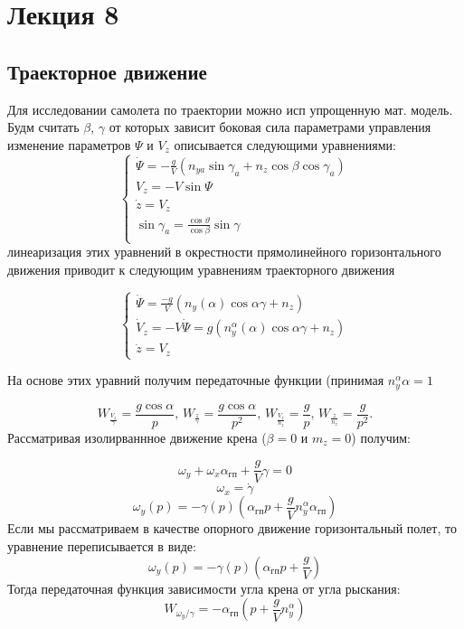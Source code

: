 \documentclass{article}
\begin{document}
\section{Лекция 8}
\subsection{Траекторное движение}
Для исследовании самолета по траектории можно исп упрощенную мат. модель. Будм считать $\beta$, $\gamma$ от которых зависит боковая сила параметрами управления изменение параметров $\Psi$ и $V_z$ описывается следующими уравнениями:
\begin{equation}
\begin{cases}
\dot{\Psi} = -\frac{g}{V}(n_{ya} \sin{\gamma_a} + n_z \cos{\beta} \cos{\gamma_a})\\
V_z = -V\sin{\Psi}\\
\dot{z} = V_z\\

\sin{\gamma_a} = \frac{\cos{\vartheta}}{\cos{\beta}} \sin{\gamma} \\
\end{cases}
\end{equation}
линеаризация этих уравнений в окрестности прямолинейного горизонтального движения приводит к следующим уравнениям траекторного движения

\begin{equation}
\begin{cases}
\dot{\Psi} = \frac{-g}{V}(n_y(\alpha)\cos{\alpha}\gamma + n_z)\\
\dot{V}_z = -V \dot{\Psi} = g(n_y^{\alpha}(\alpha) \cos{\alpha\gamma} + n_z)\\
\dot{z} = V_z
\end{cases}
\end{equation}

На основе этих уравний получим передаточные функции (принимая $n_y^{\alpha} \alpha =1 $ 

\[
W_{\frac{V_z}{\gamma}} = \frac{g\cos{\alpha}}{p}, \, W_{\frac{z}{\gamma}} = \frac{g\cos{\alpha}}{p^2}, \, W_{\frac{V_z}{n_z}}= \frac{g}{p}, \, W_{\frac{z}{n_z}} = \frac{g}{p^2}.
\]
Рассматривая изолирваннное движение крена ($\beta = 0$ и $m_z = 0$) получим:

\[
\omega_y + \omega_x \alpha_{гп} + \frac{g}{V}\gamma = 0
\]
\[
\omega_x = \dot{\gamma}
\]
\[
\omega_y(p) = -\gamma(p)(\alpha_{гп}p + \frac{g}{V}n_y^\alpha \alpha_{гп})
\]
Если мы рассматриваем в качестве опорного движение горизонтальный полет, то уравнение переписывается в виде:
\[
\omega_y(p) = -\gamma(p)(\alpha_{гп}p + \frac{g}{V})
\] 
Тогда передаточная функция зависимости угла крена от угла рыскания:
\[
W_{\omega_y/\gamma} = -\alpha_{гп}(p+\frac{g}{V}n_y^\alpha)
\]
\end{document}
